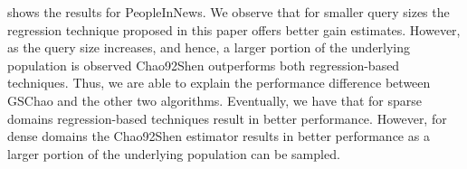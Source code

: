  shows the results for PeopleInNews. We observe that for smaller query sizes the regression technique proposed in this paper offers better gain estimates. However, as the query size increases, and hence, a larger portion of the underlying population is observed Chao92Shen outperforms both regression-based techniques. Thus, we are able to explain the performance difference between GSChao and the other two algorithms. Eventually, we have that for sparse domains regression-based techniques result in better performance. However, for dense domains the Chao92Shen estimator results in better performance as a larger portion of the underlying population can be sampled. 




